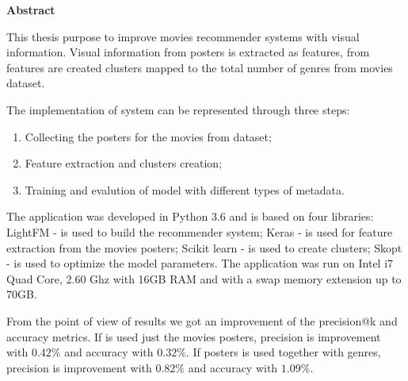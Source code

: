 \thispagestyle{plain}

\begin{center}
	\Large \textbf{Abstract}	
\end{center}

This thesis purpose to improve movies recommender systems with visual information. Visual information from posters is extracted as features, from features are created clusters mapped to the total number of genres from movies dataset.

\vspace{5mm}
The implementation of system can be represented through three steps: 
\begin{enumerate}
	\item Collecting the posters for the movies from dataset;
	\item Feature extraction and clusters creation;
	\item Training and evalution of model with different types of metadata.
\end{enumerate}

The application was developed in Python 3.6 and is based on four libraries: LightFM - is used to build the recommender system; Keras - is used for feature extraction from the movies posters; Scikit learn - is used to create clusters; Skopt - is used to optimize the model parameters. The application was run on Intel i7 Quad Core, 2.60 Ghz with 16GB RAM and with a swap memory extension up to 70GB.

\vspace{5mm}
From the point of view of results we got an improvement of the precision@k and accuracy metrics. If is used just the movies posters, precision is improvement with $0.42\%$ and accuracy with $0.32\%$. If posters is used together with genres, precision is improvement with $0.82\%$ and accuracy with $1.09\%$.
\vspace*{\fill}
